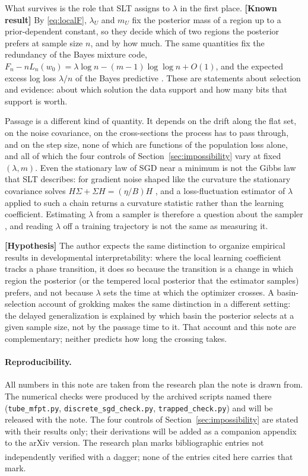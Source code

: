 \documentclass[11pt,a4paper]{article}
\newcommand{\unv}{\textsuperscript{\dag}}
\newcommand{\evl}[2]{{\small\bfseries\color{#1}[#2]}}
\newcommand{\LKnown}{\evl{cknown}{Known result}}
\newcommand{\LHyp}{\evl{chyp}{Hypothesis}}
\begin{document}
What survives is the role that SLT assigns to $\lambda$ in the first place.
\LKnown{} By \eqref{eq:localF}, $\lambda_U$ and $m_U$ fix the posterior mass
of a region up to a prior-dependent constant, so they decide which of two
regions the posterior prefers at sample size $n$, and by how much. The same
quantities fix the redundancy of the Bayes mixture code,
$F_n-nL_n(w_0)=\lambda\log n-(m-1)\log\log n+O(1)$, and the expected excess
log loss $\lambda/n$ of the Bayes predictive \cite{watanabe2009}. These are
statements about selection and evidence: about which solution the data
support and how many bits that support is worth.

Passage is a different kind of quantity. It depends on the drift along the
flat set, on the noise covariance, on the cross-sections the process has to
pass through, and on the step size, none of which are functions of the
population loss alone, and all of which the four controls of
Section~\ref{sec:impossibility} vary at fixed $(\lambda,m)$. Even the
stationary law of SGD near a minimum is not the Gibbs law that SLT
describes: for gradient noise shaped like the curvature the stationary
covariance solves $H\Sigma+\Sigma H=(\eta/B)H$ \cite{mandt2017}, and a
loss-fluctuation estimator of $\lambda$ applied to such a chain returns a
curvature statistic rather than the learning coefficient. Estimating
$\lambda$ from a sampler is therefore a question about the sampler
\cite{lau2025llc,hitchcock2025,cai2026}, and reading $\lambda$ off a
training trajectory is not the same as measuring it.

\LHyp{} The author expects the same distinction to organize empirical
results in developmental interpretability: where the local learning
coefficient tracks a phase transition, it does so because the transition is
a change in which region the posterior (or the tempered local posterior
that the estimator samples) prefers, and not because $\lambda$ sets the
time at which the optimizer crosses. A basin-selection account of grokking
\cite{cullen2026} makes the same distinction in a different setting: the
delayed generalization is explained by which basin the posterior selects at
a given sample size, not by the passage time to it. That account and this
note are complementary; neither predicts how long the crossing takes.

\paragraph{Reproducibility.} All numbers in this note are taken from the
research plan the note is drawn from. The numerical checks were produced by
the archived scripts named there (\texttt{tube\_mfpt.py},
\texttt{discrete\_sgd\_check.py}, \texttt{trapped\_check.py}) and will be
released with the note. The four controls of Section~\ref{sec:impossibility}
are stated with their results only; their derivations will be added as a
companion appendix to the arXiv version. The research plan marks
bibliographic entries not independently verified with a dagger\unv{}; none
of the entries cited here carries that mark.
\end{document}
